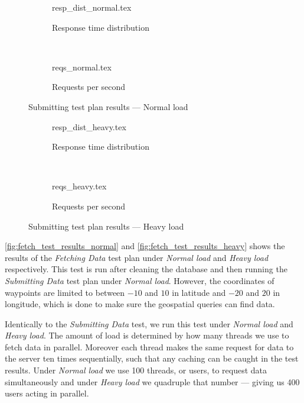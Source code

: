 \begin{figure}[!htb]
    \centering
    \begin{subfigure}[b]{\textwidth}
        \footnotesize
        \centering
        {resp_dist_normal.tex}
        \caption{Response time distribution}\label{fig:submit_resp_t_dist_normal}
    \end{subfigure}\\
    \begin{subfigure}[b]{\textwidth}
        \footnotesize
        \centering
        {reqs_normal.tex}
        \caption{Requests per second}\label{fig:submit_reqs_p_sec_normal}
    \end{subfigure}
    \caption{Submitting test plan results --- Normal load}\label{fig:submit_test_results_normal}
\end{figure}
\begin{figure}[!htb]
    \begin{subfigure}[b]{\textwidth}
        \footnotesize
        \centering
        {resp_dist_heavy.tex}
        \caption{Response time distribution}\label{fig:submit_resp_t_dist_heavy}
    \end{subfigure}\\
    \begin{subfigure}[b]{\textwidth}
        \footnotesize
        \centering
        {reqs_heavy.tex}
        \caption{Requests per second}\label{fig:submit_reqs_p_sec_heavy}
    \end{subfigure}
    \caption{Submitting test plan results --- Heavy load}\label{fig:submit_test_results_heavy}
\end{figure}

\bigskip
\cref{fig:fetch_test_results_normal} and \cref{fig:fetch_test_results_heavy} shows the results of the \textit{Fetching Data} test plan under \textit{Normal load} and \textit{Heavy load} respectively.
This test is run after cleaning the database and then running the \textit{Submitting Data} test plan under \textit{Normal load}.
However, the coordinates of waypoints are limited to between $-10$ and $10$ in latitude and $-20$ and $20$ in longitude, which is done to make sure the geospatial queries can find data.

Identically to the \textit{Submitting Data} test, we run this test under \textit{Normal load} and \textit{Heavy load}.
The amount of load is determined by how many threads we use to fetch data in parallel.
Moreover each thread makes the same request for data to the server ten times sequentially, such that any caching can be caught in the test results.
Under \textit{Normal load} we use 100 threads, or users, to request data simultaneously and under \textit{Heavy load} we quadruple that number --- giving us 400 users acting in parallel.

